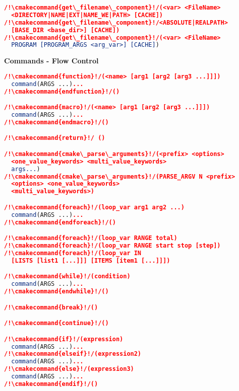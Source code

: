 \documentclass{article}
\newcommand{\cmakecommand}[1]{{\href{https://cmake.org/cmake/help/v3.13/command/#1.html}{#1}}}
\begin{document}
\hfill\vline\hfill
\begin{minipage}[t]{0.18\linewidth}
\begin{lstlisting}[language=CMake]
/!\cmakecommand{get\_filename\_component}!/(<var> <FileName>
  <DIRECTORY|NAME|EXT|NAME_WE|PATH> [CACHE])
/!\cmakecommand{get\_filename\_component}!/<ABSOLUTE|REALPATH>
  [BASE_DIR <base_dir>] [CACHE])
/!\cmakecommand{get\_filename\_component}!/(<var> <FileName>
  PROGRAM [PROGRAM_ARGS <arg_var>] [CACHE])
\end{lstlisting}

\textbf{Commands - Flow Control}
\begin{lstlisting}[language=CMake]
/!\cmakecommand{function}!/(<name> [arg1 [arg2 [arg3 ...]]])
  command(ARGS ...)...
/!\cmakecommand{endfunction}!/()

/!\cmakecommand{macro}!/(<name> [arg1 [arg2 [arg3 ...]]])
  command(ARGS ...)...
/!\cmakecommand{endmacro}!/()

/!\cmakecommand{return}!/ ()

/!\cmakecommand{cmake\_parse\_arguments}!/(<prefix> <options>
  <one_value_keywords> <multi_value_keywords>
  args...)
/!\cmakecommand{cmake\_parse\_arguments}!/(PARSE_ARGV N <prefix>
  <options> <one_value_keywords>
  <multi_value_keywords>)

/!\cmakecommand{foreach}!/(loop_var arg1 arg2 ...)
  command(ARGS ...)...
/!\cmakecommand{endforeach}!/()

/!\cmakecommand{foreach}!/(loop_var RANGE total)
/!\cmakecommand{foreach}!/(loop_var RANGE start stop [step])
/!\cmakecommand{foreach}!/(loop_var IN
  [LISTS [list1 [...]]] [ITEMS [item1 [...]]])

/!\cmakecommand{while}!/(condition)
  command(ARGS ...)...
/!\cmakecommand{endwhile}!/()

/!\cmakecommand{break}!/()

/!\cmakecommand{continue}!/()

/!\cmakecommand{if}!/(expression)
  command(ARGS ...)...
/!\cmakecommand{elseif}!/(expression2)
  command(ARGS ...)...
/!\cmakecommand{else}!/(expression3)
  command(ARGS ...)...
/!\cmakecommand{endif}!/()


\end{lstlisting}
\end{minipage}
\end{document}
